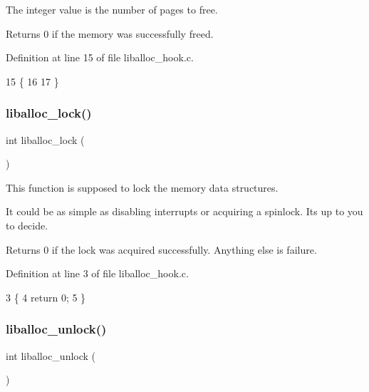 The integer value is the number of pages to free.

\begin{DoxyReturn}{Returns}
0 if the memory was successfully freed. 
\end{DoxyReturn}


Definition at line 15 of file liballoc\+\_\+hook.\+c.


\begin{DoxyCode}
15                                         \{
16 
17 \}
\end{DoxyCode}
\mbox{\label{a00029_a8b5670e4594b0b6f8be78fe17f0c3b53_a8b5670e4594b0b6f8be78fe17f0c3b53}} 
\subsubsection{\texorpdfstring{liballoc\+\_\+lock()}{liballoc\_lock()}}
{\footnotesize\ttfamily int liballoc\+\_\+lock (\begin{DoxyParamCaption}{ }\end{DoxyParamCaption})}



This function is supposed to lock the memory data structures. 

It could be as simple as disabling interrupts or acquiring a spinlock. It\textquotesingle{}s up to you to decide.

\begin{DoxyReturn}{Returns}
0 if the lock was acquired successfully. Anything else is failure. 
\end{DoxyReturn}


Definition at line 3 of file liballoc\+\_\+hook.\+c.


\begin{DoxyCode}
3                     \{
4     \textcolor{keywordflow}{return} 0;
5 \}
\end{DoxyCode}
\mbox{\label{a00029_aedc23f198b2882d41d0caa316453967b_aedc23f198b2882d41d0caa316453967b}} 
\subsubsection{\texorpdfstring{liballoc\+\_\+unlock()}{liballoc\_unlock()}}
{\footnotesize\ttfamily int liballoc\+\_\+unlock (\begin{DoxyParamCaption}{ }\end{DoxyParamCaption})}



